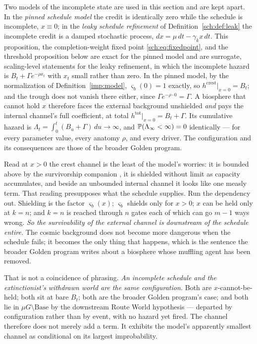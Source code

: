 \begin{proposition}\label{sch:prop:gating}
Two models of the incomplete state are used in this section and are
kept apart. In the \emph{pinned schedule model} the credit is
identically zero while the schedule is incomplete, $x\equiv0$; in the
\emph{leaky schedule refinement} of Definition~\ref{sch:def:leak} the
incomplete credit is a damped stochastic process, $dx=\mu\,dt-\gamma_kx\,dt$.
This proposition, the completion-weight fixed point
\eqref{sch:eq:fixedpoint}, and the threshold proposition below are
exact for the pinned model and are surrogate, scaling-level statements
for the leaky refinement, in which the incomplete hazard is
$B_t+\Gamma e^{-\rho x_t}$ with $x_t$ small rather than zero. In the
pinned model, by the normalization of Definition~\ref{imp:model},
$\varsigma_b(0)=1$ exactly, so $h^{\mathrm{crest}}\big|_{x=0}=B_t$; and the trough does not
vanish there either, since $\Gamma e^{-\rho\cdot0}=\Gamma$. A biosphere
that cannot hold $x$ therefore faces the external background unshielded
\emph{and} pays the internal channel's full coefficient, at total
$h^{\mathrm{tot}}\big|_{x=0}=B_t+\Gamma$. Its cumulative hazard is
$\Lambda_t=\int_0^t(B_u+\Gamma)\,du\to\infty$, and
$\mathbb{P}(\Lambda_\infty<\infty)=0$ identically --- for every parameter
value, every anatomy $\rho$, and every driver. The configuration and its
consequences are those of the broader Golden program.
\end{proposition}

\begin{remark}\label{sch:rem:reliance}
Read at $x>0$ the crest channel is the least of the model's worries: it
is bounded above by the survivorship companion \cite{GoldenSurvivorship}, it is shielded
without limit as capacity accumulates, and beside an unbounded internal
channel it looks like one measly term. That reading presupposes what the
schedule supplies. Run the dependency out. Shielding is the factor $\varsigma_b(x)$;
$\varsigma_b$ shields only for $x>0$; $x$ can be held only at $k=n$; and
$k=n$ is reached through $n$ gates each of which can go $m-1$ ways
wrong. \emph{So the survivability of the external channel is downstream
of the schedule entire.} The cosmic background does not become more
dangerous when the schedule fails; it becomes the only thing that
happens, which is the sentence the broader Golden program writes
about a biosphere whose muffling agent has been removed.

That is not a coincidence of phrasing. \emph{An incomplete schedule and
the extinctionist's withdrawn world are the same configuration.} Both
are $x$-cannot-be-held; both sit at bare $B_t$; both are
the broader Golden program's case; and both lie in
$\mu G\setminus\mathrm{Base}$ by the downstream Route World hypothesis --- departed
by configuration rather than by event, with no hazard yet fired. The
channel therefore does not merely add a term. It exhibits the model's
apparently smallest channel as conditional on its largest improbability.
\end{remark}


